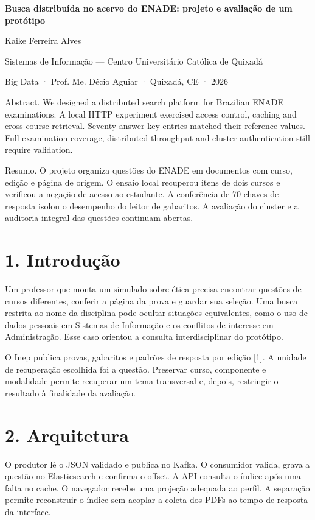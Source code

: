 \documentclass[12pt,a4paper]{article}
\begin{document}
\begin{center}{\Large\bfseries Busca distribuída no acervo do ENADE: projeto e avaliação de um protótipo}\par
Kaike Ferreira Alves\par
Sistemas de Informação — Centro Universitário Católica de Quixadá\par
Big Data · Prof. Me. Décio Aguiar · Quixadá, CE · 2026\par
\end{center}
Abstract. We designed a distributed search platform for Brazilian ENADE examinations. A local HTTP experiment exercised access control, caching and cross-course retrieval. Seventy answer-key entries matched their reference values. Full examination coverage, distributed throughput and cluster authentication still require validation.

Resumo. O projeto organiza questões do ENADE em documentos com curso, edição e página de origem. O ensaio local recuperou itens de dois cursos e verificou a negação de acesso ao estudante. A conferência de 70 chaves de resposta isolou o desempenho do leitor de gabaritos. A avaliação do cluster e a auditoria integral das questões continuam abertas.

\section*{1. Introdução}
Um professor que monta um simulado sobre ética precisa encontrar questões de cursos diferentes, conferir a página da prova e guardar sua seleção. Uma busca restrita ao nome da disciplina pode ocultar situações equivalentes, como o uso de dados pessoais em Sistemas de Informação e os conflitos de interesse em Administração. Esse caso orientou a consulta interdisciplinar do protótipo.

O Inep publica provas, gabaritos e padrões de resposta por edição [1]. A unidade de recuperação escolhida foi a questão. Preservar curso, componente e modalidade permite recuperar um tema transversal e, depois, restringir o resultado à finalidade da avaliação.

\section*{2. Arquitetura}
O produtor lê o JSON validado e publica no Kafka. O consumidor valida, grava a questão no Elasticsearch e confirma o offset. A API consulta o índice após uma falta no cache. O navegador recebe uma projeção adequada ao perfil. A separação permite reconstruir o índice sem acoplar a coleta dos PDFs ao tempo de resposta da interface.
\end{document}
